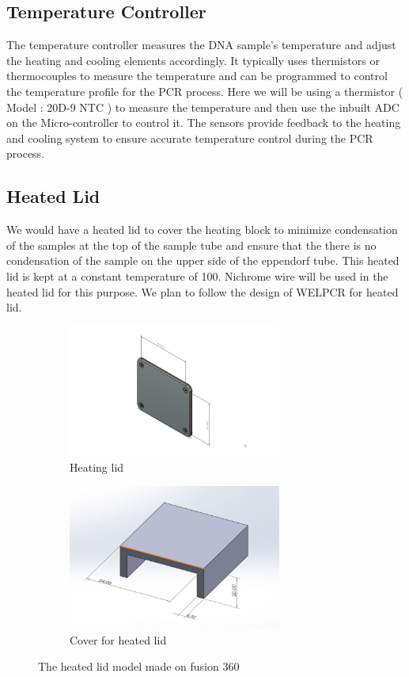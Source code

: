 \documentclass[12pt]{article}
\begin{document}
\subsection{Temperature Controller}
The temperature controller measures the DNA sample's temperature and adjust the heating and cooling elements accordingly. It typically uses thermistors or thermocouples to measure the temperature and can be programmed to control the temperature profile for the PCR process. Here we will be using a thermistor ( Model : 20D-9 NTC ) to measure the temperature and then use the inbuilt ADC on the Micro-controller to control it. The sensors provide feedback to the heating and cooling system to ensure accurate temperature control during the PCR process.

\subsection{Heated Lid}
We would have a heated lid to cover the heating block to minimize condensation of the samples at the top of the sample tube and ensure that the there is no condensation of the sample on the upper side of the eppendorf tube. This heated lid is kept at a constant temperature of 100. Nichrome wire will be used in the heated lid for this purpose. We plan to follow the design of WELPCR for heated lid.



\begin{figure}[htp]
    \centering
    \begin{subfigure}[b]{0.4\textwidth}
    \centering
    \includegraphics[width=7cm]{Images/Heatedlid1.png}
    \caption{Heating lid}
    \end{subfigure}
    \hfill
    \begin{subfigure}[b]{0.5\textwidth}
    \centering
    \includegraphics[width=7cm]{Images/heatinglid2.jpeg}
    \caption{Cover for heated lid}
    \end{subfigure}
    \caption{The heated lid model made on fusion 360}
    \label{fig:galaxy}
\end{figure}
\end{document}
